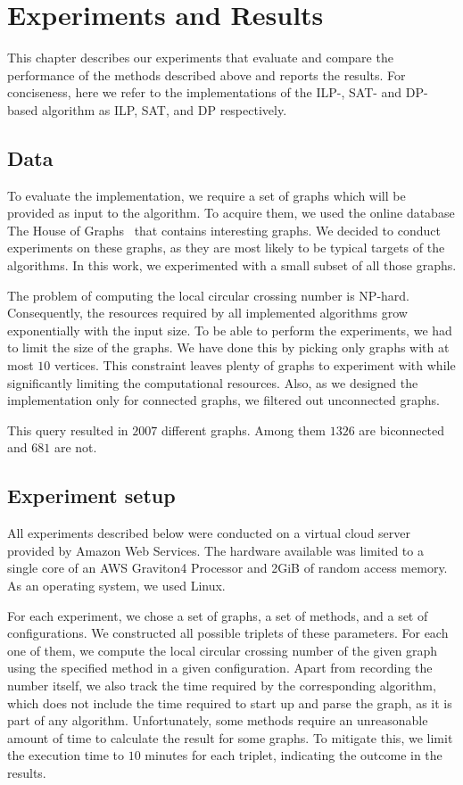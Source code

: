 \chapter{Experiments and Results}\label{ch:experiments-and-results}

This chapter describes our experiments that evaluate and compare the performance of the methods described above and reports the results. For conciseness, here we refer to the implementations of the ILP-, SAT- and DP-based algorithm as \textsf{ILP}, \textsf{SAT}, and \textsf{DP} respectively.

\section{Data}

To evaluate the implementation, we require a set of graphs which will be provided as input to the algorithm. To acquire them, we used the online database The House of Graphs~\cite{HoG} that contains interesting graphs. We decided to conduct experiments on these graphs, as they are most likely to be typical targets of the algorithms. In this work, we experimented with a small subset of all those graphs.

The problem of computing the local circular crossing number is NP-hard. Consequently, the resources required by all implemented algorithms grow exponentially with the input size. To be able to perform the experiments, we had to limit the size of the graphs. We have done this by picking only graphs with at most \(10\) vertices. This constraint leaves plenty of graphs to experiment with while significantly limiting the computational resources. Also, as we designed the implementation only for connected graphs, we filtered out unconnected graphs.

This query resulted in \(2007\) different graphs. Among them \(1326\) are biconnected and \(681\) are not.


\section{Experiment setup}

All experiments described below were conducted on a virtual cloud server provided by Amazon Web Services. The hardware available was limited to a single core of an AWS Graviton4 Processor and 2GiB of random access memory. As an operating system, we used Linux.

For each experiment, we chose a set of graphs, a set of methods, and a set of configurations. We constructed all possible triplets of these parameters. For each one of them, we compute the local circular crossing number of the given graph using the specified method in a given configuration. Apart from recording the number itself, we also track the time required by the corresponding algorithm, which does not include the time required to start up and parse the graph, as it is part of any algorithm. Unfortunately, some methods require an unreasonable amount of time to calculate the result for some graphs. To mitigate this, we limit the execution time to \(10\) minutes for each triplet, indicating the outcome in the results.

